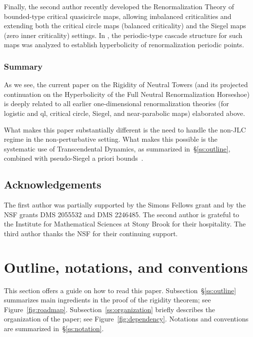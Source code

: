 \documentclass{amsart}
\begin{document}
Finally, the second author \cite{Lim23a,Lim23b,Lim24} recently developed the Renormalization Theory of bounded-type critical quasicircle maps, allowing imbalanced criticalities and extending both the critical circle maps (balanced criticality) and the Siegel maps (zero inner criticality) settings.
In \cite{Lim24}, the periodic-type cascade structure for such maps was analyzed to establish hyperbolicity of renormalization periodic points.

\subsubsection{Summary}

As we see, the current paper on the Rigidity of Neutral Towers 
(and its projected continuation on the Hyperbolicity of the Full Neutral Renormalization Horseshoe) is deeply related to all earlier one-dimensional renormalization theories 
(for logistic and ql, critical circle, Siegel, and near-parabolic maps) elaborated above. 

What makes this paper substantially different is the need to handle the non-JLC regime in the non-perturbative setting. 
What makes this possible is the systematic use of Transcendental Dynamics, as summarized in~\S\ref{ss:outline}, combined with pseudo-Siegel a priori bounds~\cite{DLy22}.


\subsection{Acknowledgements}
The first author was partially supported by the Simons Fellows grant and by the NSF grants DMS 2055532 and DMS 2246485. The second author is grateful to the Institute for Mathematical Sciences at Stony Brook for their hospitality. The third author thanks the NSF for their continuing support.


\section{Outline, notations, and conventions}
\label{sec:guide}

This section offers a guide on how to read this paper.  Subsection~\S\ref{ss:outline} summarizes main ingredients in the proof of the rigidity theorem; see Figure~\ref{fig:roadmap}.  Subsection~\ref{ss:organization} briefly describes the organization of the paper; see Figure~\ref{fig:dependency}. Notations and conventions are summarized in~\S\ref{ss:notation}.
\end{document}

